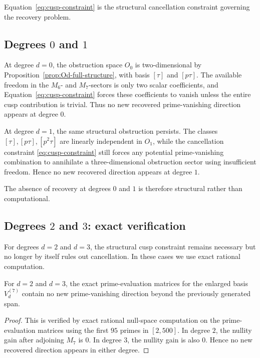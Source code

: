 Equation~\eqref{eq:cusp-constraint} is the structural cancellation constraint governing the recovery problem.

\subsection{Degrees $0$ and $1$}

At degree $d=0$, the obstruction space $O_0$ is two-dimensional by Proposition~\ref{prop:Od-full-structure}, with basis $[\tau]$ and $[p\tau]$. The available freedom in the $M_6$- and $M_7$-sectors is only two scalar coefficients, and Equation~\eqref{eq:cusp-constraint} forces these coefficients to vanish unless the entire cusp contribution is trivial. Thus no new recovered prime-vanishing direction appears at degree $0$.

At degree $d=1$, the same structural obstruction persists. The classes $[\tau],[p\tau],[p^2\tau]$ are linearly independent in $O_1$, while the cancellation constraint \eqref{eq:cusp-constraint} still forces any potential prime-vanishing combination to annihilate a three-dimensional obstruction sector using insufficient freedom. Hence no new recovered direction appears at degree $1$.

The absence of recovery at degrees $0$ and $1$ is therefore structural rather than computational.

\subsection{Degrees $2$ and $3$: exact verification}

For degrees $d=2$ and $d=3$, the structural cusp constraint remains necessary but no longer by itself rules out cancellation. In these cases we use exact rational computation.

\begin{proposition}\label{prop:no-recovery-d23}
For $d=2$ and $d=3$, the exact prime-evaluation matrices for the enlarged basis $V_d^{(7)}$ contain no new prime-vanishing direction beyond the previously generated span.
\end{proposition}

\begin{proof}
This is verified by exact rational null-space computation on the prime-evaluation matrices using the first $95$ primes in $[2,500]$. In degree $2$, the nullity gain after adjoining $M_7$ is $0$. In degree $3$, the nullity gain is also $0$. Hence no new recovered direction appears in either degree.
\end{proof}


